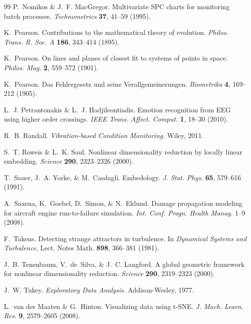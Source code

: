 \documentclass[11pt]{article}
\begin{document}
\begin{thebibliography}{99}
P.~Nomikos \& J.~F. MacGregor.
Multivariate SPC charts for monitoring batch processes.
\emph{Technometrics} \textbf{37}, 41--59 (1995).

K.~Pearson.
Contributions to the mathematical theory of evolution.
\emph{Philos. Trans. R. Soc. A} \textbf{186}, 343--414 (1895).

K.~Pearson.
On lines and planes of closest fit to systems of points in space.
\emph{Philos. Mag.} \textbf{2}, 559--572 (1901).

K.~Pearson.
Das Fehlergesetz und seine Verallgemeinerungen.
\emph{Biometrika} \textbf{4}, 169--212 (1905).

L.~J. Petrantonakis \& L.~J. Hadjileontiadis.
Emotion recognition from EEG using higher order crossings.
\emph{IEEE Trans. Affect. Comput.} \textbf{1}, 18--30 (2010).

R.~B. Randall.
\emph{Vibration-based Condition Monitoring.}
Wiley, 2011.

S.~T. Roweis \& L.~K. Saul.
Nonlinear dimensionality reduction by locally linear embedding.
\emph{Science} \textbf{290}, 2323--2326 (2000).

T.~Sauer, J.~A. Yorke, \& M.~Casdagli.
Embedology.
\emph{J. Stat. Phys.} \textbf{65}, 579--616 (1991).

A.~Saxena, K.~Goebel, D.~Simon, \& N.~Eklund.
Damage propagation modeling for aircraft engine run-to-failure simulation.
\emph{Int. Conf. Progn. Health Manag.} 1--9 (2008).

F.~Takens.
Detecting strange attractors in turbulence.
In \emph{Dynamical Systems and Turbulence}, Lect. Notes Math.
\textbf{898}, 366--381 (1981).

J.~B. Tenenbaum, V.~de~Silva, \& J.~C. Langford.
A global geometric framework for nonlinear dimensionality reduction.
\emph{Science} \textbf{290}, 2319--2323 (2000).

J.~W. Tukey.
\emph{Exploratory Data Analysis.}
Addison-Wesley, 1977.

L.~van der Maaten \& G.~Hinton.
Visualizing data using t-SNE.
\emph{J. Mach. Learn. Res.} \textbf{9}, 2579--2605 (2008).


\end{thebibliography}
\end{document}
